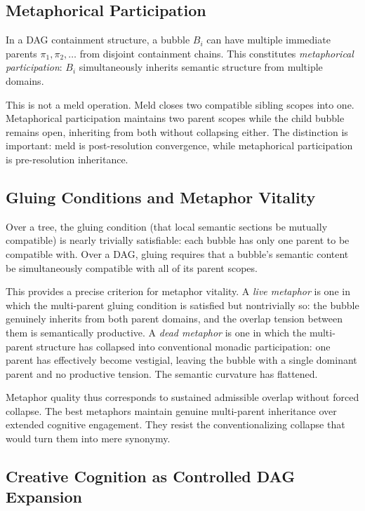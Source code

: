 \documentclass[12pt, a4paper]{article}
\theoremstyle{plain}
\theoremstyle{definition}
\theoremstyle{remark}
\begin{document}
\subsection{Metaphorical Participation}

In a DAG containment structure, a bubble $B_i$ can have multiple immediate
parents $\pi_1, \pi_2, \ldots$ from disjoint containment chains. This
constitutes \emph{metaphorical participation}: $B_i$ simultaneously inherits
semantic structure from multiple domains.

This is not a meld operation. Meld closes two compatible sibling scopes into
one. Metaphorical participation maintains two parent scopes while the child
bubble remains open, inheriting from both without collapsing either. The
distinction is important: meld is post-resolution convergence, while
metaphorical participation is pre-resolution inheritance.

\subsection{Gluing Conditions and Metaphor Vitality}

Over a tree, the gluing condition (that local semantic sections be mutually
compatible) is nearly trivially satisfiable: each bubble has only one parent
to be compatible with. Over a DAG, gluing requires that a bubble's semantic
content be simultaneously compatible with all of its parent scopes.

This provides a precise criterion for metaphor vitality. A \emph{live
metaphor} is one in which the multi-parent gluing condition is satisfied but
nontrivially so: the bubble genuinely inherits from both parent domains, and
the overlap tension between them is semantically productive. A \emph{dead
metaphor} is one in which the multi-parent structure has collapsed into
conventional monadic participation: one parent has effectively become
vestigial, leaving the bubble with a single dominant parent and no productive
tension. The semantic curvature has flattened.

Metaphor quality thus corresponds to sustained admissible overlap without
forced collapse. The best metaphors maintain genuine multi-parent inheritance
over extended cognitive engagement. They resist the conventionalizing collapse
that would turn them into mere synonymy.

\subsection{Creative Cognition as Controlled DAG Expansion}
\end{document}
